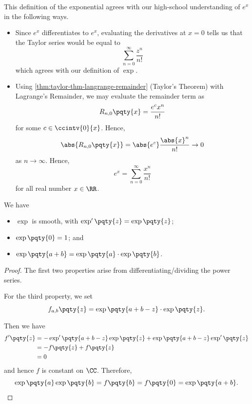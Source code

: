\begin{remarks}
    This definition of the exponential agrees with our high-school understanding of \(e^x\) in the following ways.
    \begin{itemize}
        \item Since \(e^x\) differentiates to \(e^x\), evaluating the derivatives at \(x = 0\) tells us that the Taylor series would be equal to
        \[
            \sum_{n = 0}^{\infty} \frac{z^n}{n!}
        \]
        which agrees with our definition of \(\exp\).

        \item Using \autoref{thm:taylor-thm-langrange-remainder} (Taylor's Theorem) with Lagrange's Remainder, we may evaluate the remainder term as
        \[
            R_{n, 0} \pqty{x} = \frac{e^c x^n}{n!}
        \]
        for some \(c \in \ccintv{0}{x}\). Hence,
        \[
            \abs{R_{n, 0} \pqty{x}} = \abs{e^c} \frac{\abs{x}^n}{n!} \to 0
        \]
        as \(n \to \infty\). Hence,
        \[
            e^x = \sum_{n = 0}^{\infty} \frac{x^n}{n!}
        \]
        for all real number \(x \in \RR\).
    \end{itemize}
\end{remarks}

\begin{lemma}
    \label{lem:properties-exp}%
    We have
    \begin{itemize}
        \item \(\exp\) is smooth, with \(\exp'\pqty{z} = \exp\pqty{z}\);
        \item \(\exp\pqty{0} = 1\); and
        \item \(\exp\pqty{a + b} = \exp\pqty{a} \cdot \exp\pqty{b}\).
    \end{itemize}
\end{lemma}

\begin{proof}
    The first two properties arise from differentiating/dividing the power series.

    For the third property, we set
    \[
        f_{a, b} \pqty{z} = \exp\pqty{a + b - z} \cdot \exp\pqty{z}.
    \]

    Then we have
    \begin{align*}
        f'\pqty{z} &= - \exp'\pqty{a + b - z} \exp\pqty{z} + \exp\pqty{a + b - z} \exp'\pqty{z} \\
        &= - f\pqty{z} + f\pqty{z} \\
        &= 0
    \end{align*}
    and hence \(f\) is constant on \(\CC\). Therefore,
    \[
        \exp\pqty{a} \exp\pqty{b} = f\pqty{b} = f\pqty{0} = \exp\pqty{a + b}.
    \]
\end{proof}

